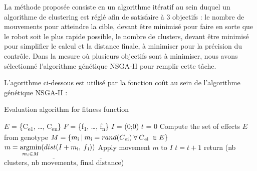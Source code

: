 \documentclass[draft]{llncs}
\newcommand{\textoverline}[1]{$\overline{\mbox{#1}}$}
\newcommand*\circled[1]{\tikz[baseline=(char.base)]{\node[shape=circle,draw,inner sep=2pt] (char) {#1};}}
\begin{document}
La méthode proposée consiste en un algorithme itératif au sein duquel un algorithme de clustering est réglé afin de satisfaire à 3 objectifs : \circled{1} le nombre de mouvements pour atteindre la cible, devant être minimisé pour faire en sorte que le robot soit le plus rapide possible, \circled{2} le nombre de clusters, devant être minimisé pour simplifier le calcul et \circled{3} la distance finale, à minimiser pour la précision du contrôle.
Dans la mesure où plusieurs objectifs sont à minimiser, nous avons sélectionné l'algorithme génétique NSGA-II\cite{Deb:2002:FEM:2221359.2221582} pour remplir cette tâche.

L'agorithme ci-dessous est utilisé par la fonction coût au sein de l'algorithme génétique NSGA-II :

      \begin{algorithm}[H]
      \caption{Evaluation algorithm for fitness function}\label{euclid}
        \begin{algorithmic}[1]
          \State $E$ = \{C\textsubscript{e1}, \dots, C\textsubscript{en}\} 
          \State $F$ = \{f\textsubscript{1}, \dots, f\textsubscript{n}\} 
          \State $I$ = (0;0) 
          \State $t$ = 0 
          \State Compute the set of effects $E$ from genotype
                  \State $M = \{ m\textsubscript{i}\:|\:m\textsubscript{i} = rand(C\textsubscript{ei})\:\forall\:C\textsubscript{ei}\:\in E\}$
                  \State $m = \operatornamewithlimits{argmin}\limits_{m_i \in M}(dist(I+m\textsubscript{i},\:f\textsubscript{i}))$
                  \State Apply movement $m$ to $I$
                  \State $t = t + 1$
                \EndWhile
              \EndFor
            \EndFor
            \State return (nb clusters, \textoverline{nb movements}, \textoverline{final distance})
        \end{algorithmic}
      \end{algorithm}
\end{document}
